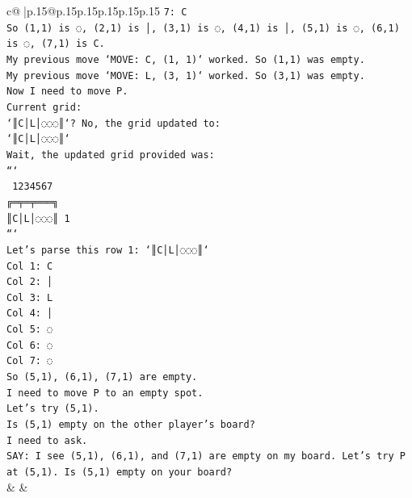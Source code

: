 \documentclass{article}
\begin{document}
{\begin{supertabular}{c@{$\;$}|p{.15\linewidth}@{}p{.15\linewidth}p{.15\linewidth}p{.15\linewidth}p{.15\linewidth}p{.15\linewidth}}
{{{\texttt{7: C} \\
\texttt{So (1,1) is ◌, (2,1) is │, (3,1) is ◌, (4,1) is │, (5,1) is ◌, (6,1) is ◌, (7,1) is C.} \\
\texttt{My previous move `MOVE: C, (1, 1)` worked. So (1,1) was empty.} \\
\texttt{My previous move `MOVE: L, (3, 1)` worked. So (3,1) was empty.} \\
\texttt{Now I need to move P.} \\
\texttt{Current grid:} \\
\texttt{`║C│L│◌◌◌║`? No, the grid updated to:} \\
\texttt{`║C│L│◌◌◌║`} \\
\texttt{Wait, the updated grid provided was:} \\
\texttt{```} \\
\texttt{ 1234567} \\
\texttt{╔═╤═╤═══╗} \\
\texttt{║C│L│◌◌◌║ 1} \\
\texttt{```} \\
\texttt{Let's parse this row 1: `║C│L│◌◌◌║`} \\
\texttt{Col 1: C} \\
\texttt{Col 2: │} \\
\texttt{Col 3: L} \\
\texttt{Col 4: │} \\
\texttt{Col 5: ◌} \\
\texttt{Col 6: ◌} \\
\texttt{Col 7: ◌} \\
\texttt{So (5,1), (6,1), (7,1) are empty.} \\
\texttt{I need to move P to an empty spot.} \\
\texttt{Let's try (5,1).} \\
\texttt{Is (5,1) empty on the other player's board?} \\
\texttt{I need to ask.} \\
\texttt{SAY: I see (5,1), (6,1), and (7,1) are empty on my board. Let's try P at (5,1). Is (5,1) empty on your board?} \\
            }
        }
    }
    & & \\ \\


\end{supertabular}}
\end{document}
